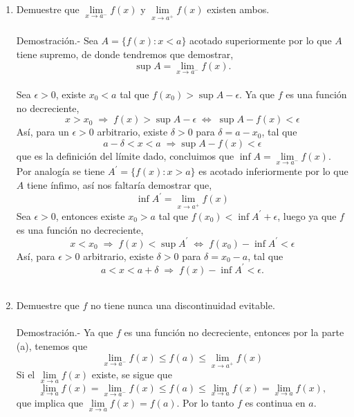 \begin{enumerate}[\bfseries 1.]
	\begin{enumerate}[\bfseries (a)]

	    \item Demuestre que $\lim\limits_{x\to a^-} f(x)$ y $\lim\limits_{x\to a^+} f(x)$ existen ambos.\\\\
		Demostración.-\; Sea $A=\lbrace f(x):x<a \rbrace$ acotado superiormente por lo que $A$ tiene supremo, de donde tendremos que demostrar, $$\sup A = \lim\limits_{x\to a^-} f(x).$$\\
		Sea $\epsilon>0$, existe $x_0<a$ tal que $f(x_0)>\sup A - \epsilon$. Ya que $f$ es una función no decreciente,
		$$x>x_0\; \Longrightarrow \; f(x)>\sup A - \epsilon \; \Longleftrightarrow \; \sup A-f(x)<\epsilon$$
		Así, para un $\epsilon>0$ arbitrario, existe $\delta > 0$ para $\delta = a - x_0$, tal que 
		$$a-\delta<x<a\; \Longrightarrow \sup A-f(x)<\epsilon$$
		que es la definición del límite dado, concluimos que $\inf A=\lim\limits_{x\to a^-} f(x).$\\
		Por analogía se tiene $A^{'}=\lbrace f(x): x>a \rbrace$ es acotado inferiormente por lo que $A$ tiene ínfimo, así nos faltaría demostrar que,
		$$\inf A^{'} = \lim_{x\to a^+} f(x)$$
		Sea $\epsilon > 0$, entonces existe $x_0>a$ tal que $f(x_0)<\inf A^{'}+\epsilon$, luego ya que $f$ es una función no decreciente,
		$$x<x_0 \; \Longrightarrow \; f(x)<\sup A^{'} \; \Longleftrightarrow \; f(x_0)-\inf A^{'} < \epsilon$$
		Así, para $\epsilon > 0$ arbitrario, existe $\delta > 0$ para $\delta = x_0 - a$, tal que 
		$$a<x<a+\delta\; \Longrightarrow \; f(x) - \inf A^{'} < \epsilon.$$\\

	    \item Demuestre que $f$ no tiene nunca una discontinuidad evitable.\\\\
		Demostración.-\; Ya que $f$ es una función no decreciente, entonces por la parte (a), tenemos que 
		$$\lim_{x\to a^-} f(x)\leq f(a)\leq \lim_{x\to a^+} f(x)$$
		Si el $\lim\limits_{x\to a} f(x)$ existe, se sigue que
		$$\lim_{x\to a}f(x)=\lim_{x\to a^-} f(x)\leq f(a)\leq \lim_{x\to a} f(x) = \lim_{x\to a} f(x),$$
		que implica que $\lim\limits_{x\to a} f(x)=f(a).$ Por lo tanto $f$ es continua en $a$.\\\\


\end{enumerate}
\end{enumerate}
